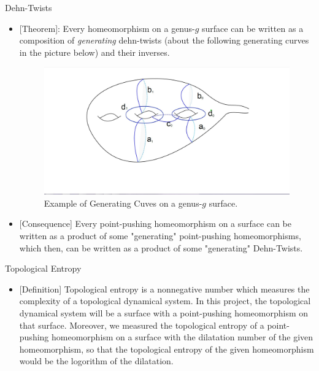 \documentclass[leqno,presentation]{beamer}
\begin{document}
\begin{frame}
\begin{columns}[t]
\begin{column}{.25\linewidth}
\begin{block}{Dehn-Twists}
\begin{itemize}
		\item {[Theorem]}: Every homeomorphism on a genus-$g$ surface can be written as a composition of \textit{generating} dehn-twists (about the following generating curves in the picture below) and their inverses.
		\vspace{1ex}
		\begin{figure}[h]
			\begin{center}
				\includegraphics[width=11in]{Ex_Dehn-Twist_Generating_Curves.jpg}
				\caption{Example of Generating Cuves on a genus-$g$ surface.}
			\end{center}
		\end{figure}
		\item {[Consequence]} Every point-pushing homeomorphism on a surface can be written as a product of some "generating" point-pushing homeomorphisms, which then, can be written as a product of some "generating" Dehn-Twists.
	\end{itemize}
\end{block}

\begin{block}{Topological Entropy}
\vspace{1ex}
\begin{itemize}
\item {[Definition]} Topological entropy is a nonnegative number which measures the complexity of a topological dynamical system. In this project, the topological dynamical system will be a surface with a point-pushing homeomorphism on that surface. Moreover, we measured the topological entropy of a point-pushing homeomorphism on a surface with the dilatation number of the given homeomorphism, so that the topological entropy of the given homeomorphism would be the logorithm of the dilatation.
\end{itemize}
\end{block}


\end{column}
\end{columns}
\end{frame}
\end{document}
